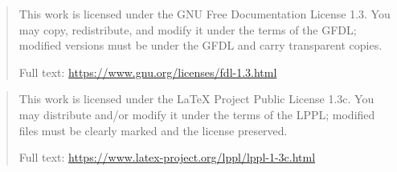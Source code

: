 \expandafter\def\csname qdissertation@licensetext@GFDL-1.3\endcsname{%
  \begin{quote}\small\raggedright
    This work is licensed under the GNU Free Documentation License 1.3. You may copy, redistribute, and modify it under the terms of the GFDL; modified versions must be under the GFDL and carry transparent copies.

    Full text: \url{https://www.gnu.org/licenses/fdl-1.3.html}
  \end{quote}%
}
\expandafter\def\csname qdissertation@licensetext@LPPL-1.3c\endcsname{%
  \begin{quote}\small\raggedright
    This work is licensed under the LaTeX Project Public License 1.3c. You may distribute and/or modify it under the terms of the LPPL; modified files must be clearly marked and the license preserved.

    Full text: \url{https://www.latex-project.org/lppl/lppl-1-3c.html}
  \end{quote}%
}

\makeatother
